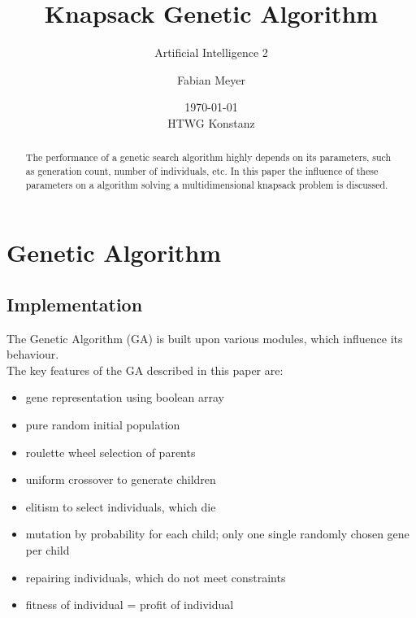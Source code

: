 \documentclass[fontsize=12pt,toc=bibliography, notitlepage]{scrreprt}
\title{Knapsack Genetic Algorithm}
\subtitle{Artificial Intelligence 2}
\author{Fabian Meyer}
\date{\today \\ HTWG Konstanz}
\begin{document}
\maketitle
\begin{abstract}
The performance of a genetic search algorithm highly depends on its parameters, such as generation count, number of individuals, etc. In this paper the influence of these parameters on a algorithm solving a multidimensional knapsack problem is discussed.
\end{abstract}
\tableofcontents

\chapter{Genetic Algorithm}
\label{chap:genetic-algorithm}

\section{Implementation}
\label{sec:implementation}

The Genetic Algorithm (GA) is built upon various modules, which influence its behaviour. \\
The key features of the GA described in this paper are:
\begin{itemize}
	\item gene representation using boolean array
	\item pure random initial population
	\item roulette wheel selection of parents
	\item uniform crossover to generate children
	\item elitism to select individuals, which die
	\item mutation by probability for each child; only one single randomly chosen gene per child
	\item repairing individuals, which do not meet constraints
	\item fitness of individual = profit of individual
\end{itemize}
\end{document}
